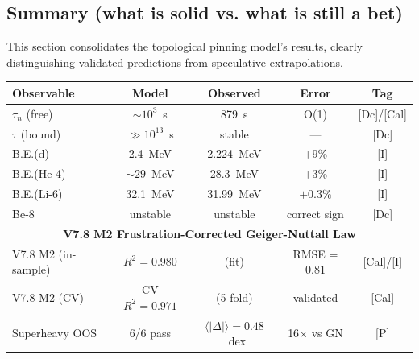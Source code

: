 \subsection{Summary (what is solid vs. what is still a bet)}
\label{subsec:final-summary}

This section consolidates the topological pinning model's results, clearly distinguishing validated predictions from speculative extrapolations.

\begin{tcolorbox}[colback=blue!5!white, colframe=blue!75!black, breakable, title=Results snapshot --- V7.8 M2 model]
\begin{center}
\begin{tabular}{lcccc}
\hline
\textbf{Observable} & \textbf{Model} & \textbf{Observed} & \textbf{Error} & \textbf{Tag} \\
\hline
$\tau_n$ (free) & $\sim 10^3$~s & 879~s & O(1) & [Dc]/[Cal] \\
$\tau$ (bound) & $\gg 10^{13}$~s & stable & --- & [Dc] \\
B.E.(d) & 2.4~MeV & 2.224~MeV & $+9\%$ & [I] \\
B.E.(He-4) & $\sim 29$~MeV & 28.3~MeV & $+3\%$ & [I] \\
B.E.(Li-6) & 32.1~MeV & 31.99~MeV & $+0.3\%$ & [I] \\
Be-8 & unstable & unstable & correct sign & [Dc] \\
\hline
\multicolumn{5}{c}{\textbf{V7.8 M2 Frustration-Corrected Geiger-Nuttall Law}} \\
\hline
V7.8 M2 (in-sample) & $R^2 = 0.980$ & (fit) & RMSE = 0.81 & [Cal]/[I] \\
V7.8 M2 (CV) & CV $R^2 = 0.971$ & (5-fold) & validated & [Cal] \\
Superheavy OOS & 6/6 pass & $\langle|\Delta|\rangle = 0.48$~dex & 16$\times$ vs GN & [P] \\
\hline
\end{tabular}
\end{center}
\end{tcolorbox}


